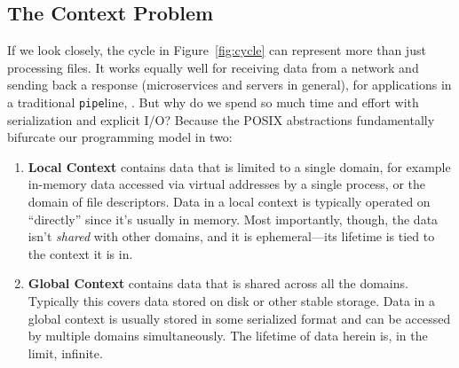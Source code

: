 \subsection{The Context Problem}

If we look closely, the cycle in Figure~\ref{fig:cycle} can represent more than just processing files. It works
equally well for receiving data from a network and sending back a response (microservices and servers in general), for
applications in a traditional \texttt{pipe}line, \etc{}. But why do we spend so much time and effort with serialization and explicit I/O? Because the POSIX abstractions
fundamentally bifurcate our programming model in two:

\begin{enumerate}
    \item \textbf{Local Context} contains data that is limited to a single domain, for example in-memory data accessed
          via virtual addresses by a single process, or the domain of file descriptors. Data in a local context is typically
          operated on ``directly'' since it's usually in memory. Most importantly, though, the data isn't \emph{shared} with
          other domains, and it is ephemeral---its lifetime is tied to the context it is in.
    \item \textbf{Global Context} contains data that is shared across all the domains. Typically this covers data stored
          on disk or other stable storage. Data in a global context is usually stored in some serialized format and can
          be accessed by multiple domains simultaneously. The lifetime of data herein is, in the limit,
          infinite.
\end{enumerate}

